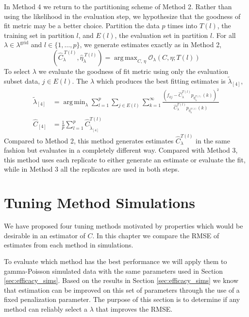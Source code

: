\documentclass[oupdraft]{bio}
\DeclareMathOperator*{\argmin}{arg\,min}
\DeclareMathOperator*{\argmax}{arg\,max}
\newcommand{\lambdagrid}{\lambda^{\text{grid}}}
\begin{document}
In Method 4 we return to the partitioning scheme of Method 2.  Rather than using the likelihood in the evaluation step, we hypothesize that the goodness of fit metric may be a better choice.  Partition the data $p$ times into $T(l)$, the training set in partition $l$, and $E(l)$, the evaluation set in partition $l$.  For all $\lambda \in \lambdagrid$ and $l \in \{1, \dots , p \}$, we generate estimates exactly as in Method 2,
\begin{equation}
\left(\widehat{C}_{\lambda}^{ \ T(l)}, \widehat{\eta}_{\lambda}^{ \ T(l)} \right) = \argmax_{C, \, \eta} \mathcal{O}_\lambda \left(C, \eta; T(l) \right) \label{eq:c_hat_lambda_method_4}
\end{equation}
To select $\lambda$ we evaluate the goodness of fit metric using only the evaluation subset data, $j \in E(l)$.  The $\lambda$ which produces the best fitting estimates is $\widetilde{\lambda}_{[4]}$,
\begin{align}
\widetilde{\lambda}_{[4]} &= \argmin_{\lambda} \sum_{l = 1}^p \sum_{j \in E(l)} \sum_{k=1}^{\infty} \frac{ \left( f_{kj} - \widehat{C}_{\lambda}^{T(l)} p_{\widehat{\eta}_{\lambda}^{T(l)}}(k) \right)^2}{\widehat{C}_{\lambda}^{T(l)}p_{\widehat{\eta}_{\lambda}^{T(l)}}(k)} \\
\widehat{C}_{[4]} &= \frac{1}{p} \sum_{l=1}^p \widehat{C}_{\widetilde{\lambda}_{[4]}}^{T(l)}
\end{align}
Compared to Method 2, this method generates estimates $\widehat{C}^{T(l)}_{\lambda}$ in the same fashion but evaluates in a completely different way.   Compared with Method 3, this method uses each replicate to either generate an estimate or evaluate the fit, while in Method 3 all the replicates are used in both steps.

\section{Tuning Method Simulations}
\label{sec:tuning_simulations}

We have proposed four tuning methods motivated by properties which would be desirable in an estimator of $C$.  In this chapter we compare the RMSE of estimates from each method in simulations.

To evaluate which method has the best performance we will apply them to gamma-Poisson simulated data with the same parameters used in Section \ref{sec:efficacy_sims}.  Based on the results in Section \ref{sec:efficacy_sims} we know that estimation can be improved on this set of parameters through the use of a fixed penalization parameter.  The purpose of this section is to determine if any method can reliably select a $\lambda$ that improves the RMSE.
\end{document}
